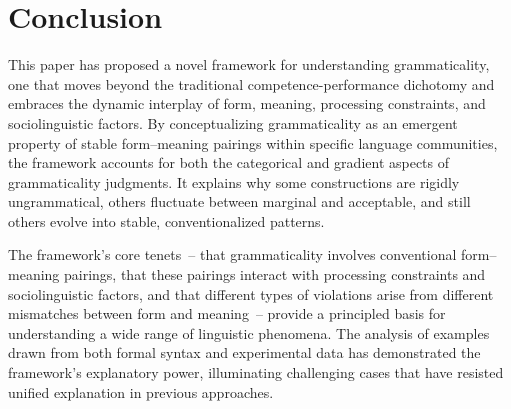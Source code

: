 \documentclass[12pt,letterpaper]{article}
\begin{document}



\section{Conclusion}

This paper has proposed a novel framework for understanding grammaticality, one that moves beyond the traditional competence-performance dichotomy and embraces the dynamic interplay of form, meaning, processing constraints, and sociolinguistic factors. By conceptualizing grammaticality as an emergent property of stable form--meaning pairings within specific language communities, the framework accounts for both the categorical and gradient aspects of grammaticality judgments. It explains why some constructions are rigidly ungrammatical, others fluctuate between marginal and acceptable, and still others evolve into stable, conventionalized patterns.

The framework's core tenets~-- that grammaticality involves conventional form--meaning pairings, that these pairings interact with processing constraints and sociolinguistic factors, and that different types of violations arise from different mismatches between form and meaning~-- provide a principled basis for understanding a wide range of linguistic phenomena. The analysis of examples drawn from both formal syntax and experimental data has demonstrated the framework's explanatory power, illuminating challenging cases that have resisted unified explanation in previous approaches.
\end{document}
